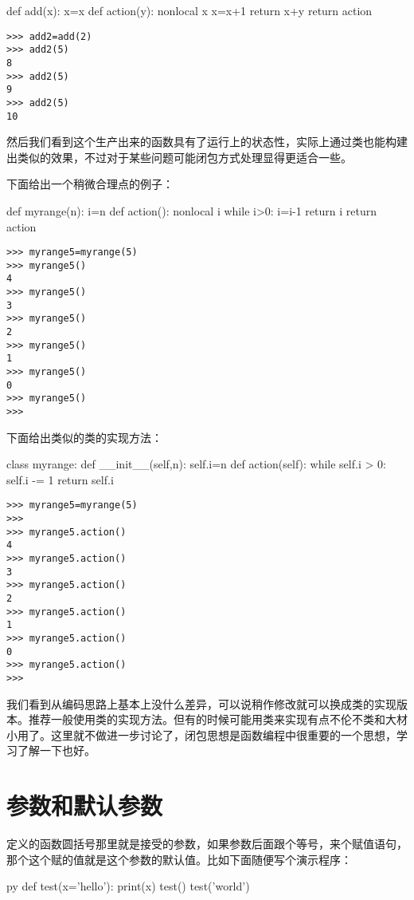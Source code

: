 \documentclass[12pt,oneside]{book}
\begin{document}
\begin{common-format}
\begin{tcbpython}
def add(x):
    x=x
    def action(y):
        nonlocal x
        x=x+1
        return x+y
    return action
\end{tcbpython}
\begin{Verbatim}
>>> add2=add(2)
>>> add2(5)
8
>>> add2(5)
9
>>> add2(5)
10
\end{Verbatim}
然后我们看到这个生产出来的函数具有了运行上的状态性，实际上通过类也能构建出类似的效果，不过对于某些问题可能闭包方式处理显得更适合一些。

下面给出一个稍微合理点的例子：
\begin{tcbpython}
def myrange(n):
    i=n
    def action():
        nonlocal i
        while i>0:
            i=i-1
            return i
    return action
\end{tcbpython}

\begin{Verbatim}
>>> myrange5=myrange(5)
>>> myrange5()
4
>>> myrange5()
3
>>> myrange5()
2
>>> myrange5()
1
>>> myrange5()
0
>>> myrange5()
>>> 
\end{Verbatim}

下面给出类似的类的实现方法：
\begin{tcbpython}
class myrange:
    def __init__(self,n):
        self.i=n
    def action(self):
        while self.i > 0:
            self.i -= 1
            return self.i
\end{tcbpython}
\begin{Verbatim}
>>> myrange5=myrange(5)
>>> 
>>> myrange5.action()
4
>>> myrange5.action()
3
>>> myrange5.action()
2
>>> myrange5.action()
1
>>> myrange5.action()
0
>>> myrange5.action()
>>> 
\end{Verbatim}
我们看到从编码思路上基本上没什么差异，可以说稍作修改就可以换成类的实现版本。推荐一般使用类的实现方法。但有的时候可能用类来实现有点不伦不类和大材小用了。这里就不做进一步讨论了，闭包思想是函数编程中很重要的一个思想，学习了解一下也好。



\section{参数和默认参数}
定义的函数圆括号那里就是接受的参数，如果参数后面跟个等号，来个赋值语句，那个这个赋的值就是这个参数的默认值。比如下面随便写个演示程序：
\begin{xverbatim}[129]{py}
def test(x='hello'):
    print(x)
test()
test('world')
\end{xverbatim}



\end{common-format}
\end{document}
